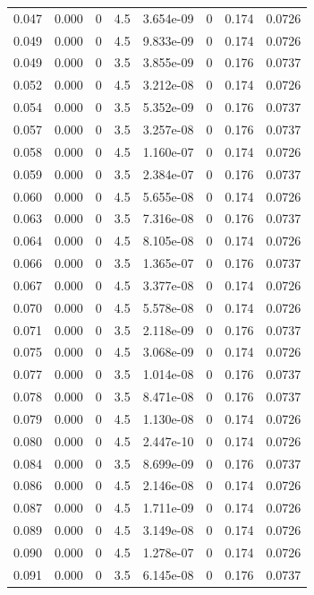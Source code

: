 \documentclass[preview]{standalone}
\begin{document}
{{\begin{tabular}{L{1.2cm}C{1.2cm} C{0.3cm}C{0.5cm} C{1.4cm}C{1.4cm} C{1.4cm}C{1.4cm}}
  0.047  &  0.000  & 0     & 4.5 &  3.654e-09  & 0  & 0.174 &  0.0726   \\ 
  0.049  &  0.000  & 0     & 4.5 &  9.833e-09  & 0  & 0.174 &  0.0726   \\ 
  0.049  &  0.000  & 0     & 3.5 &  3.855e-09  & 0  & 0.176 &  0.0737   \\ 
  0.052  &  0.000  & 0     & 4.5 &  3.212e-08  & 0  & 0.174 &  0.0726   \\ 
  0.054  &  0.000  & 0     & 3.5 &  5.352e-09  & 0  & 0.176 &  0.0737   \\ 
  0.057  &  0.000  & 0     & 3.5 &  3.257e-08  & 0  & 0.176 &  0.0737   \\ 
  0.058  &  0.000  & 0     & 4.5 &  1.160e-07  & 0  & 0.174 &  0.0726   \\ 
  0.059  &  0.000  & 0     & 3.5 &  2.384e-07  & 0  & 0.176 &  0.0737   \\ 
  0.060  &  0.000  & 0     & 4.5 &  5.655e-08  & 0  & 0.174 &  0.0726   \\ 
  0.063  &  0.000  & 0     & 3.5 &  7.316e-08  & 0  & 0.176 &  0.0737   \\ 
  0.064  &  0.000  & 0     & 4.5 &  8.105e-08  & 0  & 0.174 &  0.0726   \\ 
  0.066  &  0.000  & 0     & 3.5 &  1.365e-07  & 0  & 0.176 &  0.0737   \\ 
  0.067  &  0.000  & 0     & 4.5 &  3.377e-08  & 0  & 0.174 &  0.0726   \\ 
  0.070  &  0.000  & 0     & 4.5 &  5.578e-08  & 0  & 0.174 &  0.0726   \\ 
  0.071  &  0.000  & 0     & 3.5 &  2.118e-09  & 0  & 0.176 &  0.0737   \\ 
  0.075  &  0.000  & 0     & 4.5 &  3.068e-09  & 0  & 0.174 &  0.0726   \\ 
  0.077  &  0.000  & 0     & 3.5 &  1.014e-08  & 0  & 0.176 &  0.0737   \\ 
  0.078  &  0.000  & 0     & 3.5 &  8.471e-08  & 0  & 0.176 &  0.0737   \\ 
  0.079  &  0.000  & 0     & 4.5 &  1.130e-08  & 0  & 0.174 &  0.0726   \\ 
  0.080  &  0.000  & 0     & 4.5 &  2.447e-10  & 0  & 0.174 &  0.0726   \\ 
  0.084  &  0.000  & 0     & 3.5 &  8.699e-09  & 0  & 0.176 &  0.0737   \\ 
  0.086  &  0.000  & 0     & 4.5 &  2.146e-08  & 0  & 0.174 &  0.0726   \\ 
  0.087  &  0.000  & 0     & 4.5 &  1.711e-09  & 0  & 0.174 &  0.0726   \\ 
  0.089  &  0.000  & 0     & 4.5 &  3.149e-08  & 0  & 0.174 &  0.0726   \\ 
  0.090  &  0.000  & 0     & 4.5 &  1.278e-07  & 0  & 0.174 &  0.0726   \\ 
  0.091  &  0.000  & 0     & 3.5 &  6.145e-08  & 0  & 0.176 &  0.0737   \\ 
\hline 
\end{tabular} 

}}
\end{document}
